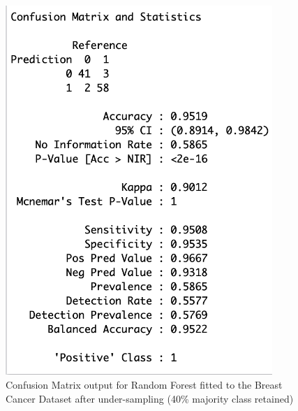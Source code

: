 \begin{figure}[!htbp]
\begin{minipage}{0.45\textwidth}
        \includegraphics[width=0.9\textwidth]{ThesisTemplate/appendix/images/Chapter5Appendix/ConfusionMatrix40/BreastCancer.png}
        \caption{Confusion Matrix output for Random Forest fitted to the Breast Cancer Dataset after under-sampling (40\% majority class retained)}
        \label{fig:matrixBC40}
    \end{minipage}
\end{figure}

